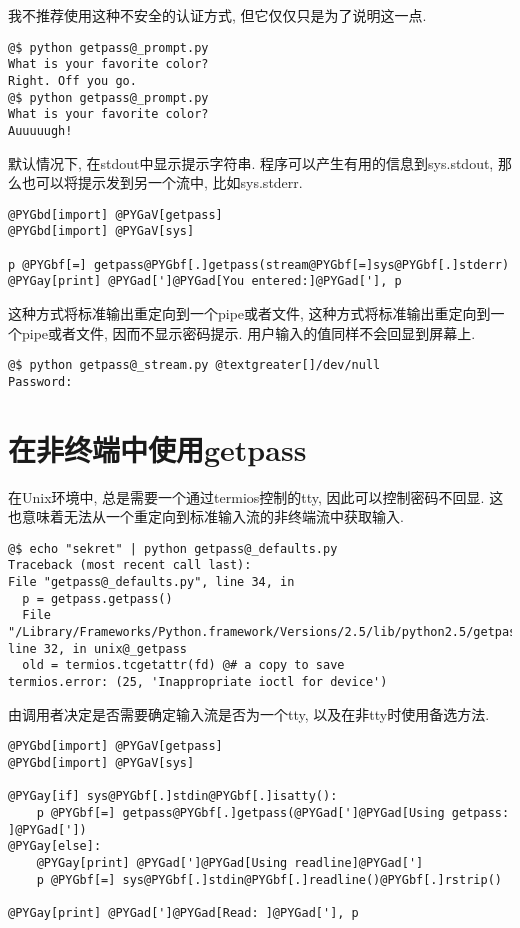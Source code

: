 \documentclass[a4paper,10pt,english]{manual}
\begin{document}
我不推荐使用这种不安全的认证方式, 但它仅仅只是为了说明这一点.

\begin{Verbatim}[commandchars=@\[\]]
@$ python getpass@_prompt.py
What is your favorite color?
Right. Off you go.
@$ python getpass@_prompt.py
What is your favorite color?
Auuuuugh!
\end{Verbatim}

默认情况下,  在stdout中显示提示字符串. 程序可以产生有用的信息到sys.stdout, 那么也可以将提示发到另一个流中, 比如sys.stderr.

\begin{Verbatim}[commandchars=@\[\]]
@PYGbd[import] @PYGaV[getpass]
@PYGbd[import] @PYGaV[sys]

p @PYGbf[=] getpass@PYGbf[.]getpass(stream@PYGbf[=]sys@PYGbf[.]stderr)
@PYGay[print] @PYGad[']@PYGad[You entered:]@PYGad['], p
\end{Verbatim}

这种方式将标准输出重定向到一个pipe或者文件, 这种方式将标准输出重定向到一个pipe或者文件, 因而不显示密码提示. 用户输入的值同样不会回显到屏幕上.

\begin{Verbatim}[commandchars=@\[\]]
@$ python getpass@_stream.py @textgreater[]/dev/null
Password:
\end{Verbatim}


\section{在非终端中使用getpass}

在Unix环境中,  总是需要一个通过termios控制的tty, 因此可以控制密码不回显. 这也意味着无法从一个重定向到标准输入流的非终端流中获取输入.

\begin{Verbatim}[commandchars=@\[\]]
@$ echo "sekret" | python getpass@_defaults.py
Traceback (most recent call last):
File "getpass@_defaults.py", line 34, in
  p = getpass.getpass()
  File "/Library/Frameworks/Python.framework/Versions/2.5/lib/python2.5/getpass.py", line 32, in unix@_getpass
  old = termios.tcgetattr(fd) @# a copy to save
termios.error: (25, 'Inappropriate ioctl for device')
\end{Verbatim}

由调用者决定是否需要确定输入流是否为一个tty, 以及在非tty时使用备选方法.

\begin{Verbatim}[commandchars=@\[\]]
@PYGbd[import] @PYGaV[getpass]
@PYGbd[import] @PYGaV[sys]

@PYGay[if] sys@PYGbf[.]stdin@PYGbf[.]isatty():
    p @PYGbf[=] getpass@PYGbf[.]getpass(@PYGad[']@PYGad[Using getpass: ]@PYGad['])
@PYGay[else]:
    @PYGay[print] @PYGad[']@PYGad[Using readline]@PYGad[']
    p @PYGbf[=] sys@PYGbf[.]stdin@PYGbf[.]readline()@PYGbf[.]rstrip()

@PYGay[print] @PYGad[']@PYGad[Read: ]@PYGad['], p
\end{Verbatim}
\end{document}
